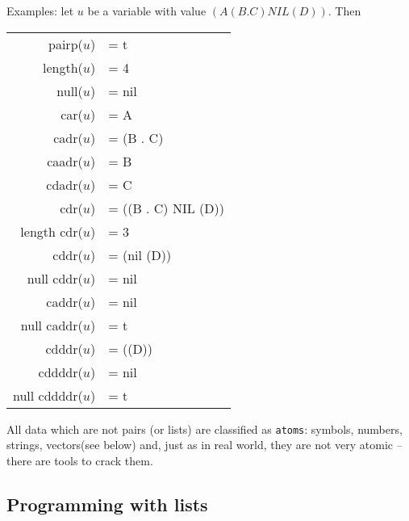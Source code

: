 \documentclass[11pt]{article}
\makeatletter
\newcommand{\ttindex}[1]{\index{#1@{\texttt{#1}}}}
\makeatother
\begin{document}
{\nopagebreak[3]
Examples: let $u$ be a variable with value $(A (B.C) NIL (D))$.  Then
\begin{center}
\begin{tabular}{rl}
  pairp($u$)       & = t\\
  length($u$)      & = 4\\
  null($u$)        & = nil\\
  car($u$)         & = A\\
  cadr($u$)        & = (B . C)\\
  caadr($u$)       & = B\\
  cdadr($u$)       & = C\\
  cdr($u$)         & = ((B . C) NIL (D))\\
  length cdr($u$)  & = 3\\
  cddr($u$)        & = (nil (D))\\
  null cddr($u$)   & = nil\\
  caddr($u$)       & = nil\\
  null caddr($u$)  & = t\\
  cdddr($u$)       & = ((D))\\
  cddddr($u$)      & = nil\\
  null cddddr($u$) & = t\\
\end{tabular}
\end{center}
}

All data which are not pairs (or lists) are classified
as \texttt{atoms}\ttindex{atom}: symbols, numbers, strings, vectors(see below)
and, just as in real world, they are not very atomic -- there
are tools to crack them.

\subsection{Programming with lists}
\end{document}

